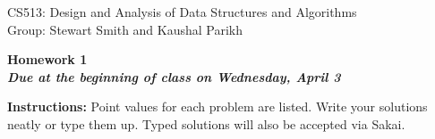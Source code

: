 \documentclass[11pt]{article}
\begin{document}
\sloppy

CS513: Design and Analysis of Data Structures and Algorithms \\
Group: Stewart Smith and Kaushal Parikh\\

\begin{center}
\LARGE{\textbf{Homework 1}}\\
\large{\textbf{\emph{Due at the beginning of class on Wednesday, April 3}}}
\end{center}

\vspace{.1in}

\noindent\textbf{Instructions:} Point values for each problem are listed.
Write your solutions neatly or type them up.  Typed solutions will also be
accepted via Sakai.
\end{document}
